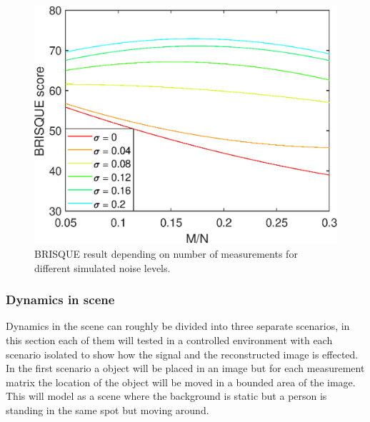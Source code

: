 \begin{figure}[H]
    \centering
    \includegraphics[width = 0.7\linewidth]{result/synt_brisque/Brisque_fit_flat.eps}
    \caption{BRISQUE result depending on number of measurements for different simulated noise levels.}
    \label{fig:Brisque_2d}
\end{figure}


\subsubsection{Dynamics in scene}
Dynamics in the scene can roughly be divided into three separate scenarios, in this section each of them will tested in a controlled environment with each scenario isolated to show how the signal and the reconstructed image is effected.\\[0.1in]

In the first scenario a object will be placed in an image but for each measurement matrix the location of the object will be moved in a bounded area of the image. This will model as a scene where the background is static but a person is standing in the same spot but moving around.

